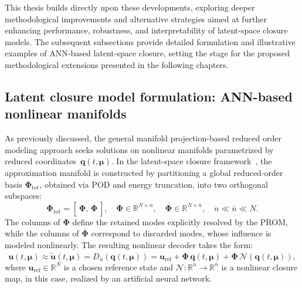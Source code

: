 This thesis builds directly upon these developments, exploring deeper methodological improvements and alternative strategies aimed at further enhancing performance, robustness, and interpretability of latent-space closure models. The subsequent subsections provide detailed formulation and illustrative examples of ANN-based latent-space closure, setting the stage for the proposed methodological extensions presented in the following chapters.


\subsection{Latent closure model formulation: ANN-based nonlinear manifolds}
\label{subsec:latent_ann_formulation}

As previously discussed, the general manifold projection-based reduced order modeling approach seeks solutions on nonlinear manifolds parametrized by reduced coordinates~$\mathbf{q}(t,\boldsymbol{\mu})$. In the latent-space closure framework~\cite{barnett2023neural, cohen2023nonlinear}, the approximation manifold is constructed by partitioning a global reduced-order basis $\boldsymbol{\Phi}_{\text{tot}}$, obtained via POD and energy truncation, into two orthogonal subspaces:
\begin{equation}
\boldsymbol{\Phi}_{\text{tot}} = [\,\boldsymbol{\Phi},\, \overline{\boldsymbol{\Phi}}\,], 
\quad 
\boldsymbol{\Phi} \in \mathbb{R}^{N \times n}, 
\quad 
\overline{\boldsymbol{\Phi}} \in \mathbb{R}^{N \times \bar{n}},
\quad 
n \ll \bar{n} \ll N.
\label{eq:basis_partition_latent}
\end{equation}
The columns of $\boldsymbol{\Phi}$ define the retained modes explicitly resolved by the PROM, while the columns of $\overline{\boldsymbol{\Phi}}$ correspond to discarded modes, whose influence is modeled nonlinearly. The resulting nonlinear decoder takes the form:
\begin{equation}
\mathbf{u}(t,\boldsymbol{\mu}) \approx \tilde{\mathbf{u}}(t,\boldsymbol{\mu}) 
= D_u(\mathbf{q}(t,\boldsymbol{\mu})) 
= \mathbf{u}_{\text{ref}} + \boldsymbol{\Phi}\,\mathbf{q}(t,\boldsymbol{\mu}) 
+ \overline{\boldsymbol{\Phi}}\,\mathcal{N}(\mathbf{q}(t,\boldsymbol{\mu})),
\label{eq:decoder_latent}
\end{equation}
where $\mathbf{u}_{\text{ref}} \in \mathbb{R}^N$ is a chosen reference state and 
$\mathcal{N}:\mathbb{R}^n\rightarrow\mathbb{R}^{\bar{n}}$ is a nonlinear closure map, in this case, realized by an artificial neural network.


